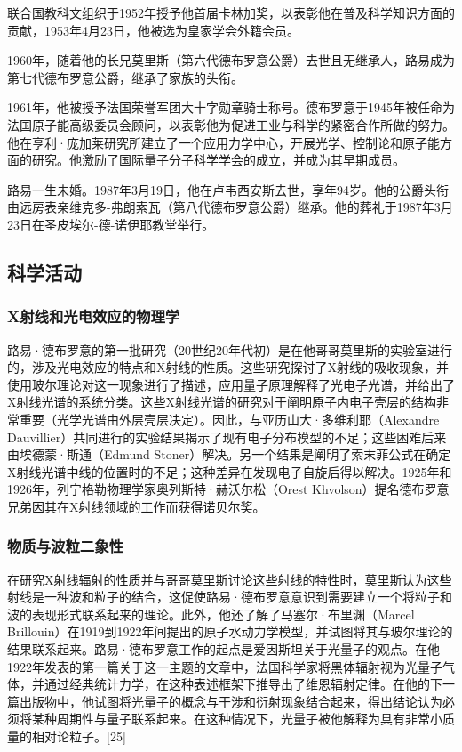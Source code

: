 联合国教科文组织于1952年授予他首届卡林加奖，以表彰他在普及科学知识方面的贡献，1953年4月23日，他被选为皇家学会外籍会员。

1960年，随着他的长兄莫里斯（第六代德布罗意公爵）去世且无继承人，路易成为第七代德布罗意公爵，继承了家族的头衔。

1961年，他被授予法国荣誉军团大十字勋章骑士称号。德布罗意于1945年被任命为法国原子能高级委员会顾问，以表彰他为促进工业与科学的紧密合作所做的努力。他在亨利·庞加莱研究所建立了一个应用力学中心，开展光学、控制论和原子能方面的研究。他激励了国际量子分子科学学会的成立，并成为其早期成员。

路易一生未婚。1987年3月19日，他在卢韦西安斯去世，享年94岁。他的公爵头衔由远房表亲维克多-弗朗索瓦（第八代德布罗意公爵）继承。他的葬礼于1987年3月23日在圣皮埃尔-德-诺伊耶教堂举行。
\subsection{科学活动}
\subsubsection{X射线和光电效应的物理学}
路易·德布罗意的第一批研究（20世纪20年代初）是在他哥哥莫里斯的实验室进行的，涉及光电效应的特点和X射线的性质。这些研究探讨了X射线的吸收现象，并使用玻尔理论对这一现象进行了描述，应用量子原理解释了光电子光谱，并给出了X射线光谱的系统分类。这些X射线光谱的研究对于阐明原子内电子壳层的结构非常重要（光学光谱由外层壳层决定）。因此，与亚历山大·多维利耶（Alexandre Dauvillier）共同进行的实验结果揭示了现有电子分布模型的不足；这些困难后来由埃德蒙·斯通（Edmund Stoner）解决。另一个结果是阐明了索末菲公式在确定X射线光谱中线的位置时的不足；这种差异在发现电子自旋后得以解决。1925年和1926年，列宁格勒物理学家奥列斯特·赫沃尔松（Orest Khvolson）提名德布罗意兄弟因其在X射线领域的工作而获得诺贝尔奖。
\subsubsection{物质与波粒二象性}  
在研究X射线辐射的性质并与哥哥莫里斯讨论这些射线的特性时，莫里斯认为这些射线是一种波和粒子的结合，这促使路易·德布罗意意识到需要建立一个将粒子和波的表现形式联系起来的理论。此外，他还了解了马塞尔·布里渊（Marcel Brillouin）在1919到1922年间提出的原子水动力学模型，并试图将其与玻尔理论的结果联系起来。路易·德布罗意工作的起点是爱因斯坦关于光量子的观点。在他1922年发表的第一篇关于这一主题的文章中，法国科学家将黑体辐射视为光量子气体，并通过经典统计力学，在这种表述框架下推导出了维恩辐射定律。在他的下一篇出版物中，他试图将光量子的概念与干涉和衍射现象结合起来，得出结论认为必须将某种周期性与量子联系起来。在这种情况下，光量子被他解释为具有非常小质量的相对论粒子。[25]

